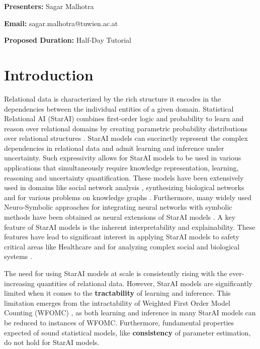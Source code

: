 
    \textbf{Presenters:} Sagar Malhotra
    
    \textbf{Email:} sagar.malhotra@tuwien.ac.at
    
    \textbf{Proposed Duration:} Half-Day Tutorial 
    \textbf{}
    
    \section{Introduction}
    
    Relational data is characterized by the rich structure it encodes in the dependencies between the individual entities of a given domain. Statistical Relational AI (StarAI) combines first-order logic and probability to learn and reason over relational domains by creating parametric probability distributions over relational structures \cite{SRL_LISA,SRL_LUC}. StarAI models can succinctly represent the complex dependencies in relational data and admit learning and inference under uncertainty. Such expressivity allows for StarAI models to be used in various applications that simultaneously require knowledge representation, learning, reasoning and  uncertainty quantification. These models have been extensively used in domains like social network analysis \cite{Problog}, synthesizing biological networks \cite{Brouard2013-iw} and for various problems on knowledge graphs \cite{bellomarini2022swift,Nickel2015ARO}. Furthermore, many widely used Neuro-Symbolic approaches for integrating neural networks with symbolic methods have been obtained as neural extensions of StarAI models \cite{belle2023statistical,DeepProblog,jaeger,marra2020neural} . A key feature of StarAI models is the inherent interpretability and explainability. These features have lead to significant interest in applying StarAI models to safety critical areas like Healthcare \cite{medicine,natarajan2017markov} and for analyzing complex social \cite{social,zhang2014identifying} and biological systems \cite{riedel2009markov,sakhanenko2010markov}. 
    

    The need for using StarAI models at scale is consistently rising with the ever-increasing quantities of  relational data. However, StarAI  models are significantly limited when it comes to the \textbf{tractability} of learning and inference. This limitation emerges from the intractability of Weighted First Order Model Counting (WFOMC) \cite{Symmetric_Weighted}, as both learning and inference in many StarAI models can be reduced to instances of WFOMC. Furthermore, fundamental properties expected of sound statistical models, like \textbf{consistency} of parameter estimation, do not hold for StarAI models. 


